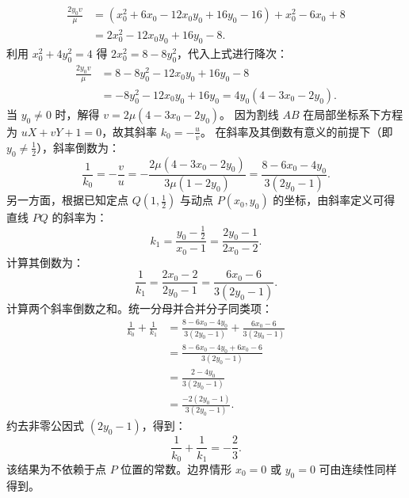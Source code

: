 \begin{solution}
\begin{align*}
\frac{2y_0 v}{\mu} &= (x_0^2 + 6x_0 - 12x_0 y_0 + 16y_0 - 16) + x_0^2 - 6x_0 + 8 \\
&= 2x_0^2 - 12x_0 y_0 + 16y_0 - 8.
\end{align*}
利用 $x_0^2 + 4y_0^2 = 4$ 得 $2x_0^2 = 8 - 8y_0^2$，代入上式进行降次：
\begin{align*}
\frac{2y_0 v}{\mu} &= 8 - 8y_0^2 - 12x_0 y_0 + 16y_0 - 8 \\
&= -8y_0^2 - 12x_0 y_0 + 16y_0 = 4y_0(4 - 3x_0 - 2y_0).
\end{align*}
当 $y_0 \neq 0$ 时，解得 $v = 2\mu(4 - 3x_0 - 2y_0)$。
因为割线 $AB$ 在局部坐标系下方程为 $uX + vY + 1 = 0$，故其斜率 $k_0 = -\frac{u}{v}$。
在斜率及其倒数有意义的前提下（即 $y_0 \neq \frac{1}{2}$），斜率倒数为：
\[ \frac{1}{k_0} = -\frac{v}{u} = -\frac{2\mu(4 - 3x_0 - 2y_0)}{3\mu(1 - 2y_0)} = \frac{8 - 6x_0 - 4y_0}{3(2y_0 - 1)}. \]
另一方面，根据已知定点 $Q\left(1, \frac{1}{2}\right)$ 与动点 $P(x_0, y_0)$ 的坐标，由斜率定义可得直线 $PQ$ 的斜率为：
\[ k_1 = \frac{y_0 - \frac{1}{2}}{x_0 - 1} = \frac{2y_0 - 1}{2x_0 - 2}. \]
计算其倒数为：
\[ \frac{1}{k_1} = \frac{2x_0 - 2}{2y_0 - 1} = \frac{6x_0 - 6}{3(2y_0 - 1)}. \]
计算两个斜率倒数之和。统一分母并合并分子同类项：
\begin{align*}
\frac{1}{k_0} + \frac{1}{k_1} &= \frac{8 - 6x_0 - 4y_0}{3(2y_0 - 1)} + \frac{6x_0 - 6}{3(2y_0 - 1)} \\
&= \frac{8 - 6x_0 - 4y_0 + 6x_0 - 6}{3(2y_0 - 1)} \\
&= \frac{2 - 4y_0}{3(2y_0 - 1)} \\
&= \frac{-2(2y_0 - 1)}{3(2y_0 - 1)}.
\end{align*}
约去非零公因式 $(2y_0 - 1)$，得到：
\[ \frac{1}{k_0} + \frac{1}{k_1} = -\frac{2}{3}. \]
该结果为不依赖于点 $P$ 位置的常数。边界情形 $x_0 = 0$ 或 $y_0 = 0$ 可由连续性同样得到。
\end{solution}




